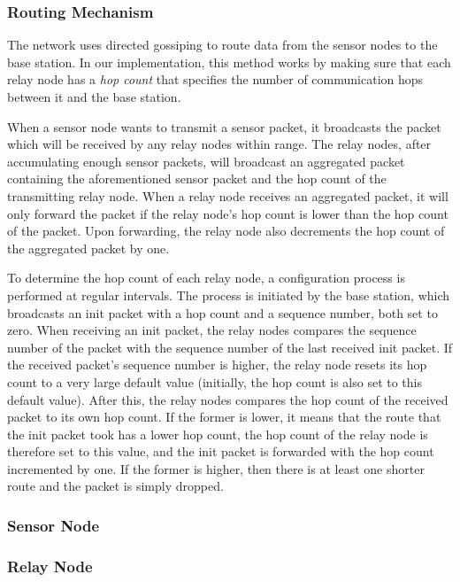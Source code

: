 \documentclass[conference]{IEEEtran}
\begin{document}
\subsubsection{Routing Mechanism}

The network uses directed gossiping to route data from the sensor nodes to the
base station. In our implementation, this method works by making sure that each
relay node has a \emph{hop count} that specifies the number of communication
hops between it and the base station.

When a sensor node wants to transmit a sensor packet, it broadcasts the packet
which will be received by any relay nodes within range. The relay nodes, after
accumulating enough sensor packets, will broadcast an aggregated packet
containing the aforementioned sensor packet and the hop count of the
transmitting relay node. When a relay node receives an aggregated packet, it
will only forward the packet if the relay node's hop count is lower than the
hop count of the packet. Upon forwarding, the relay node also decrements the
hop count of the aggregated packet by one.

To determine the hop count of each relay node, a configuration process is
performed at regular intervals. The process is initiated by the base station,
which broadcasts an init packet with a hop count and a sequence number, both
set to zero. When receiving an init packet, the relay nodes compares the
sequence number of the packet with the sequence number of the last received
init packet. If the received packet's sequence number is higher, the relay node
resets its hop count to a very large default value (initially, the hop count is
also set to this default value). After this, the relay nodes compares the hop
count of the received packet to its own hop count. If the former is lower, it
means that the route that the init packet took has a lower hop count, the hop
count of the relay node is therefore set to this value, and the init packet is
forwarded with the hop count incremented by one. If the former is higher, then
there is at least one shorter route and the packet is simply dropped.

\subsubsection{Sensor Node}

\subsubsection{Relay Node}
\end{document}
